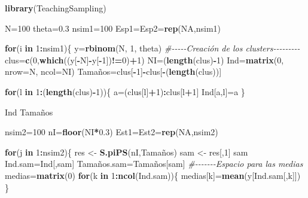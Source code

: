 \documentclass[
  12pt,
]{book}
\newenvironment{Shaded}{\begin{snugshade}}{\end{snugshade}}
\newcommand{\AttributeTok}[1]{\textcolor[rgb]{0.13,0.29,0.53}{#1}}
\newcommand{\CommentTok}[1]{\textcolor[rgb]{0.56,0.35,0.01}{\textit{#1}}}
\newcommand{\ConstantTok}[1]{\textcolor[rgb]{0.56,0.35,0.01}{#1}}
\newcommand{\ControlFlowTok}[1]{\textcolor[rgb]{0.13,0.29,0.53}{\textbf{#1}}}
\newcommand{\DecValTok}[1]{\textcolor[rgb]{0.00,0.00,0.81}{#1}}
\newcommand{\FloatTok}[1]{\textcolor[rgb]{0.00,0.00,0.81}{#1}}
\newcommand{\FunctionTok}[1]{\textcolor[rgb]{0.13,0.29,0.53}{\textbf{#1}}}
\newcommand{\NormalTok}[1]{#1}
\newcommand{\OtherTok}[1]{\textcolor[rgb]{0.56,0.35,0.01}{#1}}
\newcommand{\SpecialCharTok}[1]{\textcolor[rgb]{0.81,0.36,0.00}{\textbf{#1}}}
\begin{document}
\begin{Shaded}
\begin{Highlighting}[]
\FunctionTok{library}\NormalTok{(TeachingSampling)}

\NormalTok{N}\OtherTok{=}\DecValTok{100}
\NormalTok{theta}\OtherTok{=}\FloatTok{0.3}
\NormalTok{nsim1}\OtherTok{=}\DecValTok{100}
\NormalTok{Esp1}\OtherTok{=}\NormalTok{Esp2}\OtherTok{=}\FunctionTok{rep}\NormalTok{(}\ConstantTok{NA}\NormalTok{,nsim1)}

\ControlFlowTok{for}\NormalTok{(i }\ControlFlowTok{in} \DecValTok{1}\SpecialCharTok{:}\NormalTok{nsim1)\{}
\NormalTok{y}\OtherTok{=}\FunctionTok{rbinom}\NormalTok{(N, }\DecValTok{1}\NormalTok{, theta)}
\CommentTok{\#{-}{-}{-}{-}{-}Creación de los clusters{-}{-}{-}{-}{-}{-}{-}{-}{-}}
\NormalTok{clus}\OtherTok{=}\FunctionTok{c}\NormalTok{(}\DecValTok{0}\NormalTok{,}\FunctionTok{which}\NormalTok{((y[}\SpecialCharTok{{-}}\NormalTok{N]}\SpecialCharTok{{-}}\NormalTok{y[}\SpecialCharTok{{-}}\DecValTok{1}\NormalTok{])}\SpecialCharTok{!=}\DecValTok{0}\NormalTok{)}\SpecialCharTok{+}\DecValTok{1}\NormalTok{)}
\NormalTok{NI}\OtherTok{=}\NormalTok{(}\FunctionTok{length}\NormalTok{(clus)}\SpecialCharTok{{-}}\DecValTok{1}\NormalTok{)}
\NormalTok{Ind}\OtherTok{=}\FunctionTok{matrix}\NormalTok{(}\DecValTok{0}\NormalTok{, }\AttributeTok{nrow=}\NormalTok{N, }\AttributeTok{ncol=}\NormalTok{NI)}
\NormalTok{Tamaños}\OtherTok{=}\NormalTok{clus[}\SpecialCharTok{{-}}\DecValTok{1}\NormalTok{]}\SpecialCharTok{{-}}\NormalTok{clus[}\SpecialCharTok{{-}}\NormalTok{(}\FunctionTok{length}\NormalTok{(clus))]}

\ControlFlowTok{for}\NormalTok{(l }\ControlFlowTok{in} \DecValTok{1}\SpecialCharTok{:}\NormalTok{(}\FunctionTok{length}\NormalTok{(clus)}\SpecialCharTok{{-}}\DecValTok{1}\NormalTok{))\{}
\NormalTok{a}\OtherTok{=}\NormalTok{(clus[l]}\SpecialCharTok{+}\DecValTok{1}\NormalTok{)}\SpecialCharTok{:}\NormalTok{clus[l}\SpecialCharTok{+}\DecValTok{1}\NormalTok{]}
\NormalTok{Ind[a,l]}\OtherTok{=}\NormalTok{a}
\NormalTok{\}}

\NormalTok{Ind}
\NormalTok{Tamaños}

\NormalTok{nsim2}\OtherTok{=}\DecValTok{100}
\NormalTok{nI}\OtherTok{=}\FunctionTok{floor}\NormalTok{(NI}\SpecialCharTok{*}\FloatTok{0.3}\NormalTok{)}
\NormalTok{Est1}\OtherTok{=}\NormalTok{Est2}\OtherTok{=}\FunctionTok{rep}\NormalTok{(}\ConstantTok{NA}\NormalTok{,nsim2)}

\ControlFlowTok{for}\NormalTok{(j }\ControlFlowTok{in} \DecValTok{1}\SpecialCharTok{:}\NormalTok{nsim2)\{}
\NormalTok{res }\OtherTok{\textless{}{-}} \FunctionTok{S.piPS}\NormalTok{(nI,Tamaños)}
\NormalTok{sam }\OtherTok{\textless{}{-}}\NormalTok{ res[,}\DecValTok{1}\NormalTok{] }
\NormalTok{sam}
\NormalTok{Ind.sam}\OtherTok{=}\NormalTok{Ind[,sam]}
\NormalTok{Tamaños.sam}\OtherTok{=}\NormalTok{Tamaños[sam]}
\CommentTok{\#{-}{-}{-}{-}{-}{-}{-}Espacio para las medias}
\NormalTok{medias}\OtherTok{=}\FunctionTok{matrix}\NormalTok{(}\DecValTok{0}\NormalTok{)}
\ControlFlowTok{for}\NormalTok{(k }\ControlFlowTok{in} \DecValTok{1}\SpecialCharTok{:}\FunctionTok{ncol}\NormalTok{(Ind.sam))\{}
\NormalTok{medias[k]}\OtherTok{=}\FunctionTok{mean}\NormalTok{(y[Ind.sam[,k]])}
\NormalTok{\}}


\end{Highlighting}
\end{Shaded}
\end{document}
